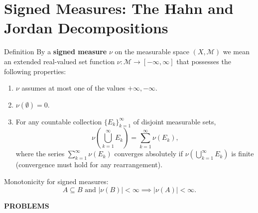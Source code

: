 \section{Signed Measures: The Hahn and Jordan Decompositions}
\begin{flushleft}
	\begin{namedthm*}{Definition}
		By a \textbf{signed measure} $\nu$ on the measurable space $(X,\mathcal{M})$ we mean an extended real-valued set function $\nu:\mathcal{M}\to[-\infty,\infty]$ that possesses the following properties:
		\begin{enumerate}[label=(\roman*),align=left]  
			\item $\nu$ assumes at most one of the values $+\infty,-\infty$.
			\item $\nu(\emptyset)=0$.
			\item For any countable collection $\{E_k\}_{k=1}^\infty$ of disjoint measurable sets,
			\[
				\nu\left(\bigcup_{k=1}^\infty E_k\right)=\sum_{k=1}^\infty\nu(E_k),
			\]
			where the series $\sum_{k=1}^\infty\nu(E_k)$ converges absolutely if $\nu(\bigcup_{k=1}^\infty E_k)$ is finite (convergence must hold for any rearrangement).
		\end{enumerate}
	\end{namedthm*}
	Monotonicity for signed measures:
	\[
	A\subseteq B\text{ and }|\nu(B)|<\infty\implies|\nu(A)|<\infty.
	\]
\end{flushleft}
\begin{center}
	\textbf{PROBLEMS}
\end{center}

